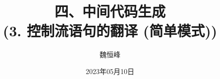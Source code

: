 \documentclass[]{beamer}
\title[中间代码生成]{四、中间代码生成 \\ (3. 控制流语句的翻译 (简单模式))}
\author[魏恒峰]{\large 魏恒峰}
\institute{hfwei@nju.edu.cn}
\date{2023年05月10日}
\begin{document}
\maketitle



\thankyou{}

\end{document}
